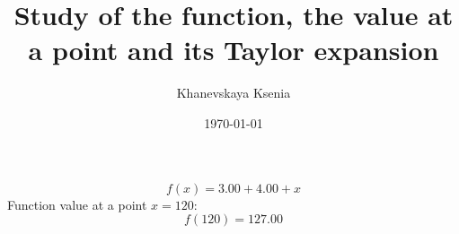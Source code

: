 \documentclass[12pt, letterpaper]{article}
\title {Study of the function, the value at a point and its Taylor expansion}
\author{Khanevskaya Ksenia}
\date{\today}
\begin{document}
\maketitle
\[f(x)=3.00+4.00+x\]
Function value at a point $x=120$: \[f(120)=127.00\]
\end{document}
